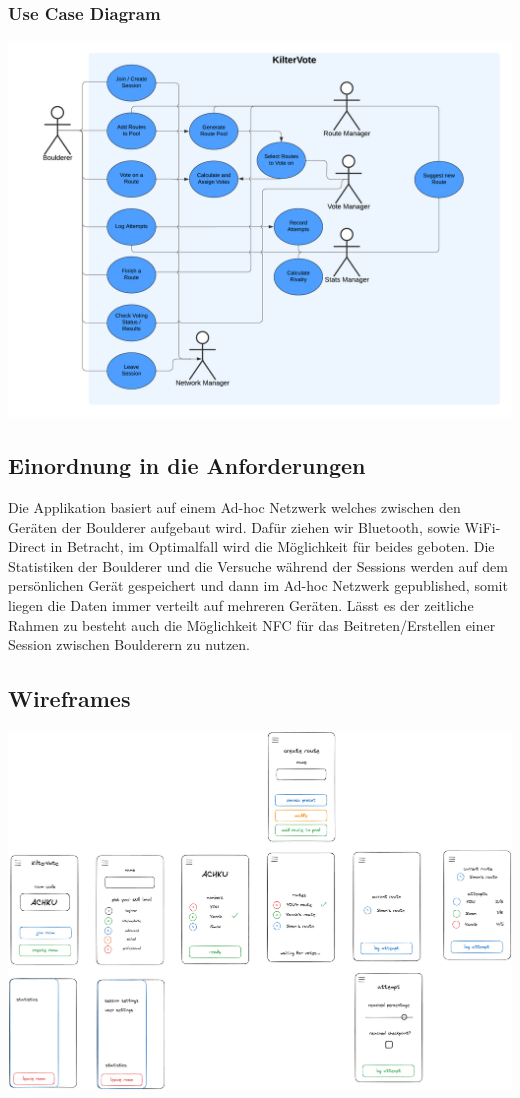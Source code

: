 \documentclass[11pt,a4paper,headsepline,footsepline,bibliography=totocnumbered]{article}
\begin{document}
    \subsubsection{Use Case Diagram}
      \includegraphics[width=\textwidth]{pictures/Use_Case_Diagram.png}

  \subsection{Einordnung in die Anforderungen}  
    \par  
      Die Applikation basiert auf einem Ad-hoc Netzwerk welches zwischen den Geräten der Boulderer aufgebaut wird.
      Dafür ziehen wir Bluetooth, sowie WiFi-Direct in Betracht, im Optimalfall wird die Möglichkeit für beides geboten.
      Die Statistiken der Boulderer und die Versuche während der Sessions werden auf dem persönlichen Gerät gespeichert und dann im Ad-hoc Netzwerk gepublished, somit liegen die Daten immer verteilt auf mehreren Geräten.
      Lässt es der zeitliche Rahmen zu besteht auch die Möglichkeit NFC für das Beitreten/Erstellen einer Session zwischen Boulderern zu nutzen.
    
  \subsection{Wireframes}
    \includegraphics[width=\textwidth]{pictures/KilterVote_GUI.png}
\end{document}
